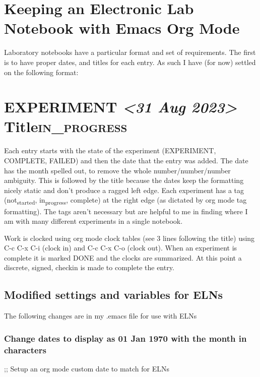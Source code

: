 \documentclass[11pt]{article}
\author{gnn}
\date{\today}
\title{}
\begin{document}
\tableofcontents

\section{Keeping an Electronic Lab Notebook with Emacs Org Mode}
\label{sec:org052189f}

Laboratory notebooks have a particular format and set of
requirements.  The first is to have proper dates, and titles for each
entry.  As such I have (for now) settled on the following format:

\section{{\bfseries\sffamily EXPERIMENT} \textit{<31 Aug 2023>} Title\hfill{}\textsc{in\_progress}}
\label{sec:org3ec6933}
Each entry starts with the state of the experiment (EXPERIMENT,
COMPLETE, FAILED) and then the date that the entry was added.  The
date has the month spelled out, to remove the whole
number/number/number ambiguity.  This is followed by the title because
the dates keep the formatting nicely static and don't produce a ragged
left edge.  Each experiment has a tag (not\textsubscript{started}, in\textsubscript{progress},
complete) at the right edge (as dictated by org mode tag formatting).
The tags aren't necessary but are helpful to me in finding where I am
with many different experiments in a single notebook.

Work is clocked using org mode clock tables (see 3 lines following the
title) using C-c C-x C-i (clock in) and C-c C-x C-o (clock out).  When
an experiment is complete it is marked DONE and the clocks are
summarized.  At this point a discrete, signed, checkin is made to
complete the entry.

\subsection{Modified settings and variables for ELNs}
\label{sec:org6c98976}

The following changes are in my .emacs file for use with ELNs

\subsubsection{Change dates to display as 01 Jan 1970 with the month in characters}
\label{sec:orgc9ce35e}

;; Setup an org mode custom date to match for ELNs
\end{document}

